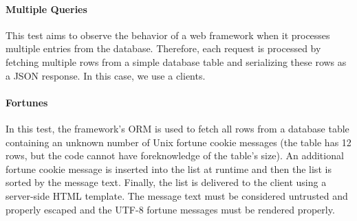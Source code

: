 \paragraph{Multiple Queries}
This test aims to observe the behavior of a web framework when it processes multiple entries from the database.
Therefore, each request is processed by fetching multiple rows from a simple database table and serializing these rows as a JSON response.
In this case, we use a   clients.

\paragraph{Fortunes}
In this test, the framework's ORM is used to fetch all rows from a database table containing an unknown number of Unix fortune cookie messages (the table has 12 rows, but the code cannot have foreknowledge of the table's size).
An additional fortune cookie message is inserted into the list at runtime and then the list is sorted by the message text.
Finally, the list is delivered to the client using a server-side HTML template.
The message text must be considered untrusted and properly escaped and the UTF-8 fortune messages must be rendered properly.

